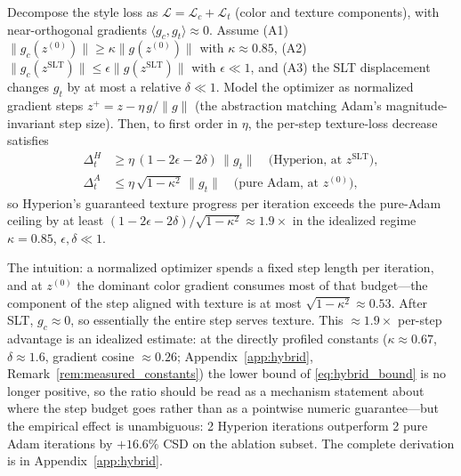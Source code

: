 \begin{proposition}
\label{prop:hybrid}
Decompose the style loss as $\mathcal{L} = \mathcal{L}_c + \mathcal{L}_t$
(color and texture components), with near-orthogonal gradients
$\langle g_c, g_t\rangle \approx 0$.
Assume (A1) $\|g_c(z^{(0)})\| \geq \kappa\|g(z^{(0)})\|$ with $\kappa \approx 0.85$,
(A2) $\|g_c(z^\mathrm{SLT})\| \leq \epsilon\|g(z^\mathrm{SLT})\|$ with $\epsilon \ll 1$,
and (A3) the SLT displacement changes $g_t$ by at most a relative
$\delta \ll 1$.
Model the optimizer as normalized gradient steps
$z^{+} = z - \eta\,g/\|g\|$ (the abstraction matching Adam's
magnitude-invariant step size).
Then, to first order in $\eta$, the per-step texture-loss decrease satisfies
\begin{align}
  \Delta_t^{H} &\geq \eta\,(1-2\epsilon-2\delta)\,\|g_t\|
  \quad\text{(Hyperion, at } z^\mathrm{SLT}\text{)}, \label{eq:hybrid_bound}\\
  \Delta_t^{A} &\leq \eta\,\sqrt{1-\kappa^2}\,\|g_t\|
  \quad\text{(pure Adam, at } z^{(0)}\text{)}, \label{eq:adam_bound}
\end{align}
so Hyperion's guaranteed texture progress per iteration exceeds the pure-Adam
ceiling by at least $(1-2\epsilon-2\delta)/\sqrt{1-\kappa^2} \approx
1.9\times$ in the idealized regime $\kappa = 0.85$, $\epsilon,\delta \ll 1$.
\end{proposition}

The intuition: a normalized optimizer spends a fixed step length per
iteration, and at $z^{(0)}$ the dominant color gradient consumes most of that
budget—the component of the step aligned with texture is at most
$\sqrt{1-\kappa^2} \approx 0.53$.
After SLT, $g_c \approx 0$, so essentially the entire step serves texture.
This $\approx 1.9\times$ per-step advantage is an idealized estimate: at
the directly profiled constants ($\kappa\approx0.67$, $\delta\approx1.6$,
gradient cosine $\approx0.26$; Appendix~\ref{app:hybrid},
Remark~\ref{rem:measured_constants}) the lower bound of
\cref{eq:hybrid_bound} is no longer positive, so the ratio should be read as
a mechanism statement about where the step budget goes rather than as a
pointwise numeric guarantee---but the empirical effect is unambiguous:
2 Hyperion iterations outperform 2 pure Adam iterations by $+16.6\%$ CSD on
the ablation subset.
The complete derivation is in Appendix~\ref{app:hybrid}.

